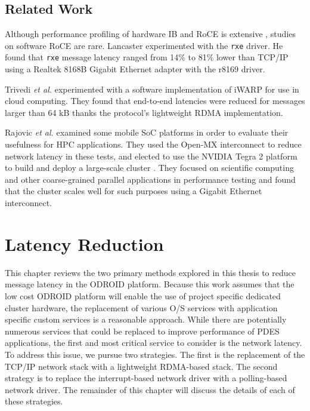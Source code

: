 \documentclass[11pt]{book}
\begin{document}
\section{Related Work}

Although performance profiling of hardware IB and RoCE is extensive
\cite{subamaroni-09,vienne-12}, studies on software RoCE are rare.  Lancaster
\cite{lancaster-10} experimented with the \verb;rxe; driver.  He found that \verb;rxe;
message latency ranged from 14\% to 81\% lower than TCP/IP using a Realtek 8168B Gigabit
Ethernet adapter with the r8169 driver.

Trivedi \emph{et al.} \cite{trivedi-11} experimented with a software implementation of
iWARP for use in cloud computing.  They found that end-to-end latencies were reduced for
messages larger than 64 kB thanks the protocol's lightweight RDMA implementation.

Rajovic \emph{et al.} \cite{rajovic-13} examined some mobile SoC platforms in order to
evaluate their usefulness for HPC applications.  They used the Open-MX interconnect to
reduce network latency in these tests, and elected to use the NVIDIA Tegra 2 platform to
build and deploy a large-scale cluster \cite{rajovic-14}.  They focused on scientific
computing and other coarse-grained parallel applications in performance testing and found
that the cluster scales well for such purposes using a Gigabit Ethernet interconnect.

\chapter{Latency Reduction}\label{latency_reduction}

This chapter reviews the two primary methods explored in this thesis to reduce message
latency in the ODROID platform.  Because this work assumes that the low cost ODROID
platform will enable the use of project specific dedicated cluster hardware, the
replacement of various O/S services with application specific custom services is a
reasonable approach.  While there are potentially numerous services that could be replaced
to improve performance of PDES applications, the first and most critical service to
consider is the network latency.  To address this issue, we pursue two strategies.  The
first is the replacement of the TCP/IP network stack with a lightweight RDMA-based stack.
The second strategy is to replace the interrupt-based network driver with a polling-based
network driver.  The remainder of this chapter will discuss the details of each of these
strategies.
\end{document}
